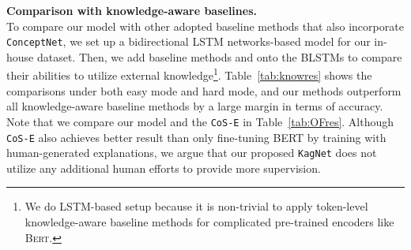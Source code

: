 \documentclass[11pt,a4paper]{article}
\begin{document}
\begin{table}[t]
	\centering
	\caption{Comparisons with knowledge-aware baseline methods using the in-house split (both easy and hard mode) on top of BLSTM as the sentence encoder. }
	\label{tab:knowres}
\end{table}
\smallskip
\noindent
 \textbf{Comparison with knowledge-aware baselines.} \\
To compare our model with other adopted baseline methods that also incorporate \texttt{ConceptNet}, 
we set up a bidirectional LSTM networks-based model for our in-house dataset.
Then, we add baseline methods and \KagNet onto the BLSTMs to compare their abilities to utilize external knowledge\footnote{We do LSTM-based setup because it is non-trivial to apply token-level knowledge-aware baseline methods for complicated pre-trained encoders like \textsc{Bert}.}.
Table~\ref{tab:knowres} shows the comparisons under both easy mode and hard mode, and our methods outperform all knowledge-aware baseline methods by a large margin in terms of accuracy.
Note that we compare our model and the \texttt{CoS-E} in Table~\ref{tab:OFres}. 
Although \texttt{CoS-E} also achieves better result than only fine-tuning BERT by training with human-generated explanations, we argue that our proposed \texttt{KagNet} does not utilize any additional human efforts to provide more supervision. 
\end{document}
